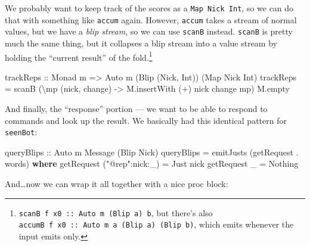 \documentclass[]{article}
\newenvironment{Shaded}{}{}
\newcommand{\DataTypeTok}[1]{\textcolor[rgb]{0.56,0.13,0.00}{#1}}
\newcommand{\FunctionTok}[1]{\textcolor[rgb]{0.02,0.16,0.49}{#1}}
\newcommand{\KeywordTok}[1]{\textcolor[rgb]{0.00,0.44,0.13}{\textbf{#1}}}
\newcommand{\NormalTok}[1]{#1}
\newcommand{\OperatorTok}[1]{\textcolor[rgb]{0.40,0.40,0.40}{#1}}
\newcommand{\OtherTok}[1]{\textcolor[rgb]{0.00,0.44,0.13}{#1}}
\newcommand{\StringTok}[1]{\textcolor[rgb]{0.25,0.44,0.63}{#1}}
\begin{document}
We probably want to keep track of the scores as a \texttt{Map\ Nick\ Int}, so we
can do that with something like \texttt{accum} again. However, \texttt{accum}
takes a stream of normal values, but we have a \emph{blip stream}, so we can use
\texttt{scanB} instead. \texttt{scanB} is pretty much the same thing, but it
collapses a blip stream into a value stream by holding the ``current result'' of
the fold.\footnote{\texttt{scanB\ f\ x0\ ::\ Auto\ m\ (Blip\ a)\ b}, but there's
  also \texttt{accumB\ f\ x0\ ::\ Auto\ m\ a\ (Blip\ a)\ (Blip\ b)}, which emits
  whenever the input emits only.}

\begin{Shaded}
\begin{Highlighting}[]
\OtherTok{trackReps ::} \DataTypeTok{Monad}\NormalTok{ m }\OtherTok{=>} \DataTypeTok{Auto}\NormalTok{ m (}\DataTypeTok{Blip}\NormalTok{ (}\DataTypeTok{Nick}\NormalTok{, }\DataTypeTok{Int}\NormalTok{)) (}\DataTypeTok{Map} \DataTypeTok{Nick} \DataTypeTok{Int}\NormalTok{)}
\NormalTok{trackReps }\OtherTok{=}\NormalTok{ scanB (\textbackslash{}mp (nick, change) }\OtherTok{{-}>}\NormalTok{ M.insertWith (}\OperatorTok{+}\NormalTok{) nick change mp) M.empty}
\end{Highlighting}
\end{Shaded}

And finally, the ``response'' portion --- we want to be able to respond to
commands and look up the result. We basically had this identical pattern for
\texttt{seenBot}:

\begin{Shaded}
\begin{Highlighting}[]
\OtherTok{queryBlips ::} \DataTypeTok{Auto}\NormalTok{ m }\DataTypeTok{Message}\NormalTok{ (}\DataTypeTok{Blip} \DataTypeTok{Nick}\NormalTok{)}
\NormalTok{queryBlips }\OtherTok{=}\NormalTok{ emitJusts (getRequest }\OperatorTok{.} \FunctionTok{words}\NormalTok{)}
  \KeywordTok{where}
\NormalTok{    getRequest (}\StringTok{"@rep"}\OperatorTok{:}\NormalTok{nick}\OperatorTok{:}\NormalTok{\_) }\OtherTok{=} \DataTypeTok{Just}\NormalTok{ nick}
\NormalTok{    getRequest \_                }\OtherTok{=} \DataTypeTok{Nothing}
\end{Highlighting}
\end{Shaded}

And\ldots now we can wrap it all together with a nice proc block:
\end{document}

